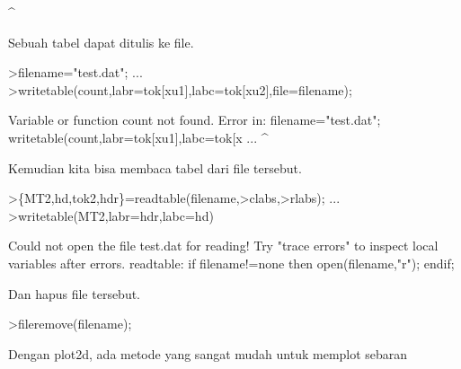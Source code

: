\documentclass[a4paper,10pt]{article}
\begin{document}
\begin{eulernotebook}
\begin{eulercomment}
\begin{eulercomment}
\begin{eulercomment}
\begin{eulercomment}
\begin{eulercomment}
\begin{eulercomment}
\begin{eulercomment}
\begin{eulercomment}
\begin{eulercomment}
\begin{eulercomment}
\begin{eulercomment}
\begin{eulercomment}
\begin{eulercomment}
\begin{eulercomment}
\begin{eulercomment}
\begin{eulercomment}
\begin{eulercomment}
\begin{eulercomment}
\begin{eulercomment}
\begin{eulercomment}
\begin{eulercomment}
\begin{eulercomment}
\begin{eulercomment}
\begin{eulercomment}
\begin{eulercomment}
\begin{eulercomment}
\begin{eulercomment}
\begin{eulercomment}
\begin{eulercomment}
\begin{eulercomment}
\begin{eulercomment}
\begin{eulercomment}
\begin{eulercomment}
\begin{eulercomment}
\begin{eulercomment}
\begin{eulercomment}
\begin{eulercomment}
\begin{eulercomment}
\begin{eulercomment}
\begin{eulercomment}
\begin{eulercomment}
\begin{eulercomment}
\begin{eulercomment}
\begin{eulercomment}
\begin{eulercomment}
\begin{eulercomment}
\begin{eulercomment}
\begin{eulercomment}
\begin{eulercomment}
\begin{eulercomment}
\begin{eulercomment}
\begin{eulercomment}
\begin{eulercomment}
\begin{eulercomment}
\begin{eulercomment}
\begin{eulercomment}
\begin{eulercomment}
\begin{eulercomment}
\begin{eulercomment}
\begin{eulercomment}
\begin{eulercomment}
\begin{eulercomment}
\begin{eulercomment}
\begin{eulercomment}
\begin{eulercomment}
\begin{eulercomment}
\begin{euleroutput}
     ^
\end{euleroutput}
\begin{eulercomment}
Sebuah tabel dapat ditulis ke file.
\end{eulercomment}
\begin{eulerprompt}
>filename="test.dat"; ...
>writetable(count,labr=tok[xu1],labc=tok[xu2],file=filename);
\end{eulerprompt}
\begin{euleroutput}
  Variable or function count not found.
  Error in:
  filename="test.dat"; writetable(count,labr=tok[xu1],labc=tok[x ...
                                       ^
\end{euleroutput}
\begin{eulercomment}
Kemudian kita bisa membaca tabel dari file tersebut.
\end{eulercomment}
\begin{eulerprompt}
>\{MT2,hd,tok2,hdr\}=readtable(filename,>clabs,>rlabs); ...
>writetable(MT2,labr=hdr,labc=hd)
\end{eulerprompt}
\begin{euleroutput}
  Could not open the file
  test.dat
  for reading!
  Try "trace errors" to inspect local variables after errors.
  readtable:
      if filename!=none then open(filename,"r"); endif;
\end{euleroutput}
\begin{eulercomment}
Dan hapus file tersebut.
\end{eulercomment}
\begin{eulerprompt}
>fileremove(filename);
\end{eulerprompt}
\begin{eulercomment}
Dengan plot2d, ada metode yang sangat mudah untuk memplot sebaran 
\end{eulercomment}
\end{eulercomment}
\end{eulercomment}
\end{eulercomment}
\end{eulercomment}
\end{eulercomment}
\end{eulercomment}
\end{eulercomment}
\end{eulercomment}
\end{eulercomment}
\end{eulercomment}
\end{eulercomment}
\end{eulercomment}
\end{eulercomment}
\end{eulercomment}
\end{eulercomment}
\end{eulercomment}
\end{eulercomment}
\end{eulercomment}
\end{eulercomment}
\end{eulercomment}
\end{eulercomment}
\end{eulercomment}
\end{eulercomment}
\end{eulercomment}
\end{eulercomment}
\end{eulercomment}
\end{eulercomment}
\end{eulercomment}
\end{eulercomment}
\end{eulercomment}
\end{eulercomment}
\end{eulercomment}
\end{eulercomment}
\end{eulercomment}
\end{eulercomment}
\end{eulercomment}
\end{eulercomment}
\end{eulercomment}
\end{eulercomment}
\end{eulercomment}
\end{eulercomment}
\end{eulercomment}
\end{eulercomment}
\end{eulercomment}
\end{eulercomment}
\end{eulercomment}
\end{eulercomment}
\end{eulercomment}
\end{eulercomment}
\end{eulercomment}
\end{eulercomment}
\end{eulercomment}
\end{eulercomment}
\end{eulercomment}
\end{eulercomment}
\end{eulercomment}
\end{eulercomment}
\end{eulercomment}
\end{eulercomment}
\end{eulercomment}
\end{eulercomment}
\end{eulercomment}
\end{eulercomment}
\end{eulercomment}
\end{eulercomment}
\end{eulercomment}
\end{eulernotebook}
\end{document}
